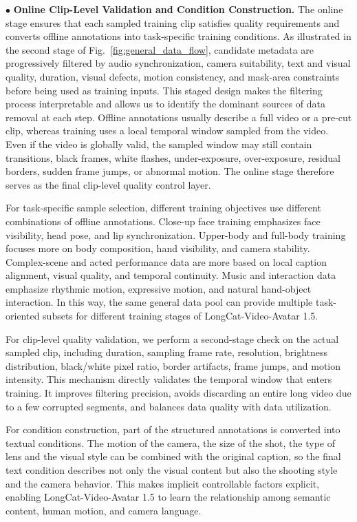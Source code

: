 $\bullet$ \textbf{Online Clip-Level Validation and Condition Construction.}
The online stage ensures that each sampled training clip satisfies quality requirements and converts offline annotations into task-specific training conditions. As illustrated in the second stage of Fig.~\ref{fig:general_data_flow}, candidate metadata are progressively filtered by audio synchronization, camera suitability, text and visual quality, duration, visual defects, motion consistency, and mask-area constraints before being used as training inputs. This staged design makes the filtering process interpretable and allows us to identify the dominant sources of data removal at each step. Offline annotations usually describe a full video or a pre-cut clip, whereas training uses a local temporal window sampled from the video. Even if the video is globally valid, the sampled window may still contain transitions, black frames, white flashes, under-exposure, over-exposure, residual borders, sudden frame jumps, or abnormal motion. The online stage therefore serves as the final clip-level quality control layer.


For task-specific sample selection, different training objectives use different combinations of offline annotations. Close-up face training emphasizes face visibility, head pose, and lip synchronization. Upper-body and full-body training focuses more on body composition, hand visibility, and camera stability. Complex-scene and acted performance data are more based on local caption alignment, visual quality, and temporal continuity. Music and interaction data emphasize rhythmic motion, expressive motion, and natural hand-object interaction. In this way, the same general data pool can provide multiple task-oriented subsets for different training stages of LongCat-Video-Avatar 1.5.

For clip-level quality validation, we perform a second-stage check on the actual sampled clip, including duration, sampling frame rate, resolution, brightness distribution, black/white pixel ratio, border artifacts, frame jumps, and motion intensity. This mechanism directly validates the temporal window that enters training. It improves filtering precision, avoids discarding an entire long video due to a few corrupted segments, and balances data quality with data utilization.

For condition construction, part of the structured annotations is converted into textual conditions. The motion of the camera, the size of the shot, the type of lens and the visual style can be combined with the original caption, so the final text condition describes not only the visual content but also the shooting style and the camera behavior. This makes implicit controllable factors explicit, enabling LongCat-Video-Avatar 1.5 to learn the relationship among semantic content, human motion, and camera language.

